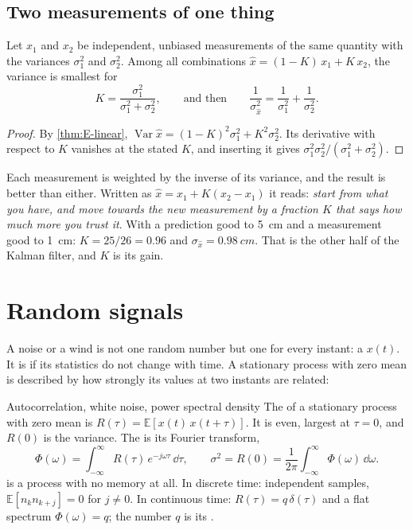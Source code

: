 \subsection{Two measurements of one thing}

\begin{theorem}
\label{thm:E-fuse}
Let $x_1$ and $x_2$ be independent, unbiased measurements of the same quantity with the variances $\sigma_1^2$ and $\sigma_2^2$. Among all combinations $\hat x = (1 - K)\,x_1 + K\,x_2$, the variance is smallest for
\begin{equation}\label{eq:E-fuse}
  K = \frac{\sigma_1^2}{\sigma_1^2 + \sigma_2^2}, \qquad\text{and then}\qquad \frac{1}{\sigma_{\hat x}^2} = \frac{1}{\sigma_1^2} + \frac{1}{\sigma_2^2} .
\end{equation}
\end{theorem}
\begin{proof}
By \cref{thm:E-linear}, $\operatorname{Var}\hat x = (1 - K)^2\sigma_1^2 + K^2\sigma_2^2$. Its derivative with respect to $K$ vanishes at the stated $K$, and inserting it gives $\sigma_1^2\sigma_2^2/(\sigma_1^2 + \sigma_2^2)$.
\end{proof}

Each measurement is weighted by the inverse of its variance, and the result is better than either. Written as $\hat x = x_1 + K(x_2 - x_1)$ it reads: \emph{start from what you have, and move towards the new measurement by a fraction $K$ that says how much more you trust it}. With a prediction good to \SI{5}{cm} and a measurement good to \SI{1}{cm}: $K = 25/26 = 0.96$ and $\sigma_{\hat x} = \SI{0.98}{cm}$. That is the other half of the Kalman filter, and $K$ is its gain.

\section{Random signals}

A noise or a wind is not one random number but one for every instant: a  $x(t)$. It is  if its statistics do not change with time. A stationary process with zero mean is described by how strongly its values at two instants are related:

\begin{definition}{Autocorrelation, white noise, power spectral density}
The  of a stationary process with zero mean is $R(\tau) = \mathbb{E}[x(t)\,x(t + \tau)]$. It is even, largest at $\tau = 0$, and $R(0)$ is the variance. The  is its Fourier transform,
\begin{equation}
  \Phi(\omega) = \int_{-\infty}^{\infty} R(\tau)\,e^{-j\omega\tau}\,\dd\tau, \qquad \sigma^2 = R(0) = \frac{1}{2\pi}\int_{-\infty}^{\infty}\Phi(\omega)\,\dd\omega .
\end{equation}
 is a process with no memory at all. In discrete time: independent samples, $\mathbb{E}[n_k n_{k+j}] = 0$ for $j \ne 0$. In continuous time: $R(\tau) = q\,\delta(\tau)$ and a flat spectrum $\Phi(\omega) = q$; the number $q$ is its .
\end{definition}

